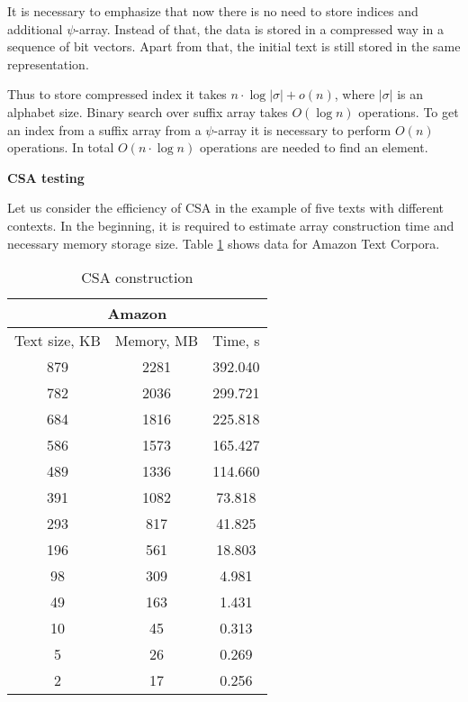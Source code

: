 It is necessary to emphasize that now there is no need to store indices and additional $\psi$-array.
Instead of that, the data is stored in a compressed way in a sequence of bit vectors.
Apart from that, the initial text is still stored in the same representation.

Thus to store compressed index it takes $n \cdot \log |\sigma| + o(n)$, where
$|\sigma|$ is an alphabet size. Binary search over suffix array takes $O(\log n)$ operations.
To get an index from a suffix array from a $\psi$-array it is necessary to perform $O(n)$ operations.
In total $O(n\cdot \log n)$ operations are needed to find an element.

\textbf{CSA testing}

Let us consider the efficiency of CSA in the example of five texts with different contexts.
In the beginning, it is required to estimate array construction time and necessary memory storage size.
Table \ref{table:6} shows data for Amazon Text Corpora.


\begin{table}[ht!]
	\centering
	\begin{tabular}{|c|c|c|}
		\hline
		\multicolumn{3}{|c|}{Amazon} \\
		\hline
		Text size, KB & Memory, MB & Time, s\\
		\hline
		879 & 2281 & 392.040\\
		\hline
		782 & 2036 & 299.721\\
		\hline
		684 & 1816 & 225.818\\
		\hline
		586 & 1573 & 165.427\\
		\hline
		489 & 1336 & 114.660\\
		\hline
		391 & 1082 & 73.818\\
		\hline
		293 & 817 & 41.825\\
		\hline
		196 & 561 & 18.803\\
		\hline
		98 & 309 & 4.981\\
		\hline
		49 & 163 & 1.431\\
		\hline
		10 & 45 & 0.313\\
		\hline
		5 & 26 & 0.269\\
		\hline
		2 & 17 & 0.256\\
		\hline
	\end{tabular}
	\caption{CSA construction}
	\label{table:6}
\end{table}

